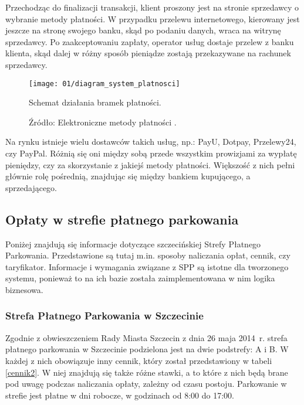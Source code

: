 Przechodząc do finalizacji transakcji, klient proszony jest na stronie 
sprzedawcy o wybranie metody płatności. W przypadku przelewu internetowego, 
kierowany jest jeszcze na stronę swojego banku, skąd po podaniu danych, wraca 
na witrynę sprzedawcy. Po zaakceptowaniu zapłaty, operator usług dostaje 
przelew z banku klienta, skąd dalej w różny sposób pieniądze zostają 
przekazywane na rachunek sprzedawcy.

\begin{figure}[h]
	\begin{center}
		\texttt{[image: 01/diagram\_system\_platnosci]}
	\end{center}
	\caption{Schemat działania bramek płatności.}
	\vspace{-0.4cm}
	\caption*{Źródło: Elektroniczne metody płatności \cite{elektroniczne_metody_platnosci}.}
\end{figure}

Na rynku istnieje wielu dostawców takich usług, np.: PayU, Dotpay, Przelewy24, 
czy PayPal. Różnią się oni między sobą przede wszystkim prowizjami za wypłatę 
pieniędzy, czy za skorzystanie z jakiejś metody płatności. Większość z nich 
pełni głównie rolę pośrednią, znajdując się między bankiem kupującego, a 
sprzedającego. 

\subsection{Opłaty w strefie płatnego parkowania}

Poniżej znajdują się informacje dotyczące szczecińskiej Strefy Płatnego Parkowania. Przedstawione są tutaj m.in. sposoby naliczania opłat, cennik, czy taryfikator. Informacje i wymagania związane z SPP są istotne dla tworzonego systemu, ponieważ to na ich bazie została zaimplementowana w nim logika biznesowa.

\subsubsection*{Strefa Płatnego Parkowania w Szczecinie}

Zgodnie z obwieszczeniem Rady Miasta Szczecin z dnia 26 maja 2014~r. \cite{obwieszczenie} strefa płatnego parkowania w Szczecinie podzielona jest na dwie podstrefy: A i B. W każdej z nich obowiązuje inny cennik, który został przedstawiony w tabeli \ref{cennik2}. W niej znajdują się także różne stawki, a to które z nich będą brane pod uwagę podczas naliczania opłaty, zależny od czasu postoju. Parkowanie w strefie jest płatne w dni robocze, w godzinach od 8:00 do 17:00.

